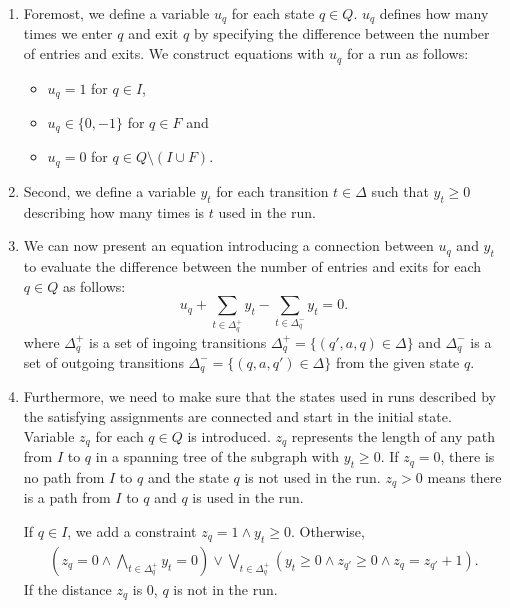 \begin{enumerate}
    \item \label{clauses:u_original} Foremost, we define a variable $u_{q}$ for each state $q \in Q$. $u_{q}$ defines how many times we enter $q$ and exit $q$ by specifying the difference between the number of entries and exits. We construct equations with $u_{q}$ for a run as follows:
    \begin{itemize}
        \item $u_{q} = 1$ for $q \in I$,
        \item $u_{q} \in \{ 0, -1 \}$ for $q \in F$ and
        \item $u_{q} = 0$ for $q \in Q \setminus ( I \cup F )$.
    \end{itemize}

    \item \label{clauses:y_original} Second, we define a variable $y_{t}$ for each transition $t \in \Delta$ such that $y_{t} \geq 0$ describing how many times is $t$ used in the run.

    \item \label{clauses:uy_original} We can now present an equation introducing a connection between $u_{q}$ and $y_{t}$ to evaluate the difference between the number of entries and exits for each $q \in Q$ as follows:
    $$ u_q + \sum_{t \in \Delta_q^+} y_t - \sum_{t \in \Delta_q^-} y_t = 0.$$
    where $\Delta_q^+$ is a set of ingoing transitions $ \Delta_q^+ = \{ (q',a,q) \in \Delta \}$ and $\Delta_q^-$ is a set of outgoing transitions $ \Delta_q^- = \{ (q,a,q') \in \Delta \} $ from the given state $q$.

    \item \label{clauses:z_original} Furthermore, we need to make sure that the states used in runs described by the satisfying assignments are connected and start in the initial state. Variable $z_q$ for each $q \in Q$ is introduced. $z_q$ represents the length of any path from $I$ to $q$ in a spanning tree of the subgraph with $y_t \geq 0$. If $z_q = 0$, there is no path from $I$ to $q$ and the state $q$ is not used in the run. $z_q > 0$ means there is a path from $I$ to $q$ and $q$ is used in the run.

    If $q \in I$, we add a constraint $z_q = 1 \land y_t \geq 0$. Otherwise,
    {
    \begin{align*}
        (z_q = 0 \land \bigwedge_{t \in \Delta_q^+} y_t = 0) \lor \bigvee_{t \in \Delta_q^+} (y_t \geq 0 \land z_{q'} \geq 0 \land z_q = z_{q'} + 1) \text{.}
    \end{align*}
    }
    If the distance $z_q$ is $0$, $q$ is not in the run.


\end{enumerate}
